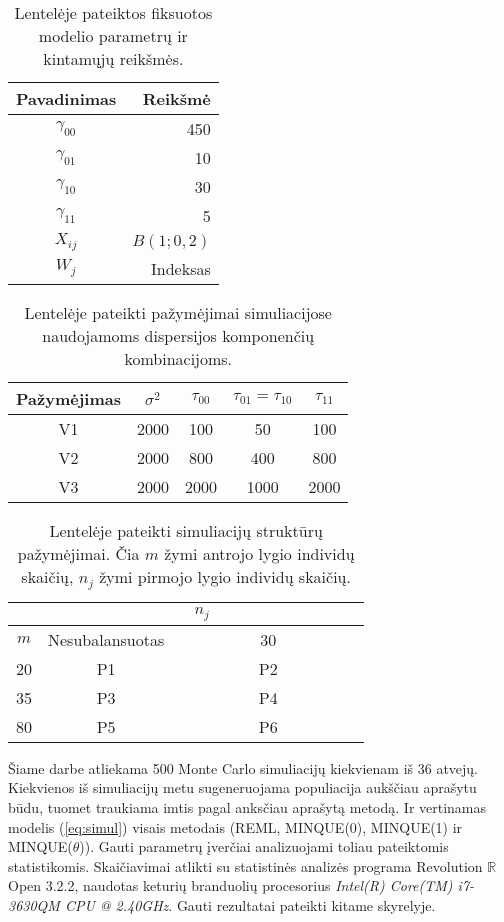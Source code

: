 \documentclass[11pt,a4paper]{article}
\newcommand{\R}{{\mathbb R}}
\begin{document}
\begin{table}[ht]
\centering
\begin{tabular}{|c|r|}
\hline
Pavadinimas & Reikšmė\\
\hline
$\gamma_{00}$& 450  \\
$\gamma_{01}$& 10  \\
$\gamma_{10}$& 30 \\
$\gamma_{11}$& 5  \\
$X_{ij}$ &  $B\left(1; 0,2\right)$ \\
$W_{j}$ &  Indeksas \\
\hline
\end{tabular}
\caption{Lentelėje pateiktos fiksuotos modelio parametrų ir kintamųjų reikšmės.}
\label{table:fixed}
\end{table}

\begin{table}[ht]
\centering
\begin{tabular}{|c|cccc|}
\hline
 Pažymėjimas & $\sigma^2$&$\tau_{00}$&$\tau_{01}=\tau_{10}$&$\tau_{11}$\\
\hline
V1&2000&100&50&100\\
V2&2000&800&400&800\\
V3&2000&2000&1000&2000\\
\hline
\end{tabular}
\caption{Lentelėje pateikti pažymėjimai simuliacijose naudojamoms dispersijos komponenčių kombinacijoms.}
\label{table:struct2}
\end{table}

\begin{table}[ht]
\centering
\begin{tabular}{|c|cc|}
\hline
 & \multicolumn{2}{c|}{$n_j$}\\
\hline
$m$& Nesubalansuotas & \ \ \ \ \ \ \ \ \ \ 30\ \ \ \ \ \ \ \ \ \ \\
\hline
20& P1&P2\\
35&P3&P4\\
80& P5&P6\\
\hline
\end{tabular}
\caption{Lentelėje pateikti simuliacijų struktūrų pažymėjimai. Čia $m$ žymi antrojo lygio individų skaičių, $n_j$ žymi pirmojo lygio individų skaičių.}
\label{table:struct1}
\end{table}



\indent Šiame darbe atliekama 500 Monte Carlo simuliacijų kiekvienam iš 36 atvejų. Kiekvienos iš simuliacijų metu sugeneruojama populiacija aukščiau aprašytu būdu, tuomet traukiama imtis pagal anksčiau aprašytą metodą. Ir vertinamas modelis (\ref{eq:simul}) visais metodais (REML, MINQUE(0), MINQUE(1) ir MINQUE($\theta$)). Gauti parametrų įverčiai analizuojami toliau pateiktomis statistikomis. Skaičiavimai atlikti su statistinės analizės programa Revolution $\R$ Open 3.2.2, naudotas keturių branduolių procesorius \textit{Intel(R) Core(TM) i7-3630QM CPU @ 2.40GHz}. Gauti rezultatai pateikti kitame skyrelyje.
\end{document}
